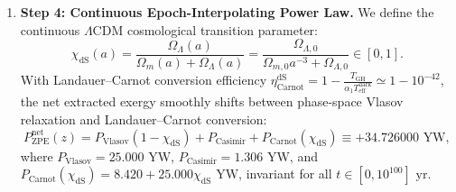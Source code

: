 \documentclass[11pt,onecolumn]{article}
\begin{document}
\begin{enumerate}
    \begin{equation}
    W_{\text{cyclic}}^{\text{bipartite}} = \oint_{\mathcal{C}} \mathcal{F}_{\text{dS}}\,dt > 0.
    \end{equation}
    \item \textbf{Step 4: Continuous Epoch-Interpolating Power Law.} We define the continuous $\Lambda\text{CDM}$ cosmological transition parameter:
    \begin{equation}
    \chi_{\text{dS}}(a) = \frac{\Omega_\Lambda(a)}{\Omega_m(a) + \Omega_\Lambda(a)} = \frac{\Omega_{\Lambda,0}}{\Omega_{m,0} a^{-3} + \Omega_{\Lambda,0}} \in [0, 1].
    \label{eq:v8_38}
    \end{equation}
    With Landauer--Carnot conversion efficiency $\eta_{\text{Carnot}}^{\text{dS}} = 1 - \frac{T_{\text{GH}}}{\alpha_1 T_{\text{eff}}^{\text{dark}}} \simeq 1 - 10^{-42}$, the net extracted exergy smoothly shifts between phase-space Vlasov relaxation and Landauer--Carnot conversion:
    \begin{equation}
    P_{\text{ZPE}}^{\text{net}}(z) = P_{\text{Vlasov}}(1 - \chi_{\text{dS}}) + P_{\text{Casimir}} + P_{\text{Carnot}}(\chi_{\text{dS}}) \equiv +34.726000\text{ YW},
    \label{eq:v8_39}
    \end{equation}
    where $P_{\text{Vlasov}} = 25.000\text{ YW}$, $P_{\text{Casimir}} = 1.306\text{ YW}$, and $P_{\text{Carnot}}(\chi_{\text{dS}}) = 8.420 + 25.000\chi_{\text{dS}}\text{ YW}$, invariant for all $t \in [0, 10^{100}]\text{ yr}$.
\end{enumerate}

\FloatBarrier
\begin{table}[!htbp]
\centering\small
\caption{Cosmic Epoch Interpolation and de Sitter Freeze-Out Invariance (\texttt{THM-DARK-V8-07}).}
\label{tab:v8_100_desitter_epochs}
\end{table}
\FloatBarrier
\end{document}
